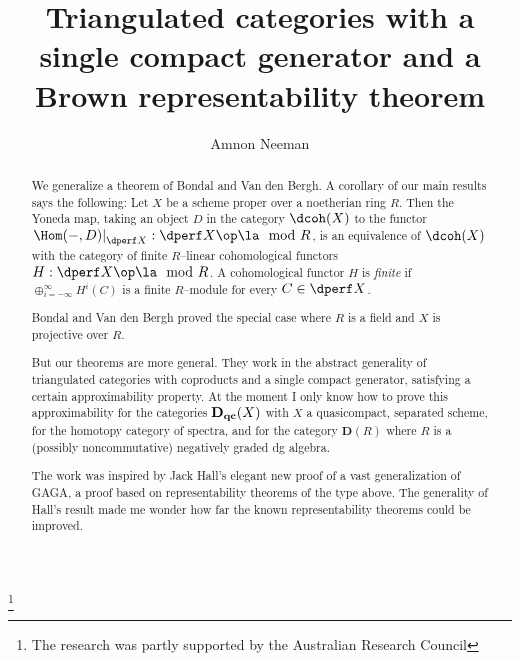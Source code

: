 \documentclass[11pt]{amsart}
\newcommand{\D}{{\mathbf D}}
\newcommand{\Dqc}{{\mathbf D_{\text{\bf qc}}}}
\begin{document}
\author{Amnon Neeman}\thanks{The research was partly supported 
by the Australian Research Council}
\address{Centre for Mathematics and its Applications \\
        Mathematical Sciences Institute\\
        John Dedman Building\\
        The Australian National University\\
        Canberra, ACT 2601\\
        AUSTRALIA}


\title[A Brown representability theorem]{Triangulated categories with a single
  compact generator and a Brown representability theorem}

\begin{abstract}
  We generalize a theorem of Bondal and Van den Bergh. A corollary
  of our main results says the following:
  Let $X$ be a scheme proper
  over a noetherian ring $R$. Then the Yoneda map, taking an object
  $D$ in the category
  $\dcoh(X)$ to the
  functor $\Hom(-,D)|_{\dperf X}^{}:\dperf X\op\la\mod R$, is an equivalence
  of $\dcoh(X)$ with the category of finite
  $R$--linear cohomological functors
  $H:\dperf X\op\la\mod R$. A cohomological functor $H$ is \emph{finite} if
  $\oplus_{i=-\infty}^\infty H^i(C)$ is a
  finite $R$--module for every $C\in\dperf X$.

  Bondal and Van den Bergh proved the special case where $R$ is a field
  and $X$ is projective over $R$.

  But our theorems are more general. They work in the abstract generality
  of triangulated categories with coproducts and a single
  compact generator, satisfying a certain approximability
  property. At the moment I only know how to prove this
  approximability for the categories $\Dqc(X)$ with $X$
  a quasicompact,
  separated scheme, for the
   homotopy category of spectra, and for the category $\D(R)$ where $R$
  is a (possibly noncommutative) negatively graded dg algebra.

  The work was inspired by Jack Hall's elegant new proof of a vast
  generalization of GAGA, a proof based on representability theorems of
  the type above. The generality of Hall's result made me wonder how far
  the known representability theorems could be improved.
\end{abstract}



\end{document}
